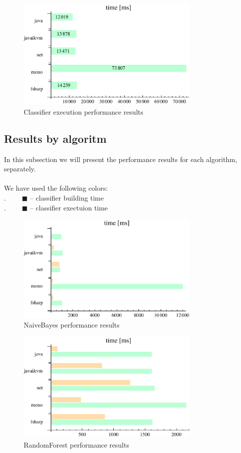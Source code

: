 \documentclass[journal]{IEEEtran/IEEEtran}
\newcommand\subsect[1]{\subsection{#1}\noindent}
\newcommand\tab[0]{{\color{white}.}\ \ \ \ }
\begin{document}
\begin{figure}[H]
\centering
\includegraphics[width=3.5in]{classify}
\caption{Classifier execution performance results}
\end{figure}
\subsect{Results by algoritm}
In this subsection we will present the performance results for each algorithm, separately.\\ \ \\
We have used the following colors:
\\
\tab {\color{orange} $\blacksquare$} -- classifier building time\\
\tab {\color{green} $\blacksquare$} -- classifier exectuion time\\
\begin{figure}[H]
\centering
\includegraphics[width=3.5in]{NaiveBayes}
\caption{NaiveBayes performance results}
\end{figure}
\begin{figure}[H]
\centering
\includegraphics[width=3.5in]{RandomForest}
\caption{RandomForest performance results}
\end{figure}
\end{document}
